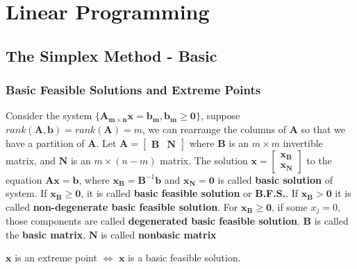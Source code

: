 	\part{Linear Programming}\label{LP}
		\chapter{The Simplex Method - Basic}
			\section{Basic Feasible Solutions and Extreme Points}
				\begin{definition}
					Consider the system $\{\mathbf{A_{m\times n}x} = \mathbf{b_m}, \mathbf{b_m}\ge \mathbf{0}\}$, suppose $rank(\mathbf{A}, \mathbf{b}) = rank(\mathbf{A}) = m$, we can rearrange the columns of $\mathbf{A}$ so that we have a partition of $\mathbf{A}$. Let $\mathbf{A} = \left[\begin{matrix}\mathbf{B} & \mathbf{N}\end{matrix}\right]$ where $\mathbf{B}$ is an $m\times m$ invertible matrix, and $\mathbf{N}$ is an $m\times (n-m)$ matrix. The solution $\mathbf{x}=\left[\begin{matrix}\mathbf{x_B}\\\mathbf{x_N}\end{matrix}\right]$ to the equation $\mathbf{Ax} = \mathbf{b}$, where $\mathbf{x_B} = \mathbf{B}^{-1} \mathbf{b}$ and $\mathbf{x_N} = \mathbf{0}$ is called \textbf{basic solution} of system. If $\mathbf{x_B} \ge \mathbf{0}$, it is called \textbf{basic feasible solution} or \textbf{B.F.S.}. If $\mathbf{x_B} > \mathbf{0}$ it is called \textbf{non-degenerate basic feasible solution}. For $\mathbf{x_B} \ge \mathbf{0}$, if some $x_j = 0$, those components are called \textbf{degenerated basic feasible solution}. $\mathbf{B}$ is called the \textbf{basic matrix}, $\mathbf{N}$ is called \textbf{nonbasic matrix}
				\end{definition}

				\begin{theorem}
					$\mathbf{x}$ is an extreme point $\iff$ $\mathbf{x}$ is a basic feasible solution.
				\end{theorem}

